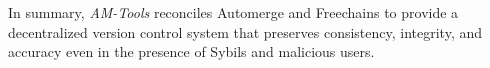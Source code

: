 \documentclass[12pt]{article}
\newcommand{\AMT}      {\emph{AM-Tools}\xspace}
\begin{document}
In summary, \AMT reconciles Automerge and Freechains to provide a decentralized
version control system that preserves consistency, integrity, and accuracy even
in the presence of Sybils and malicious users.

\end{document}
